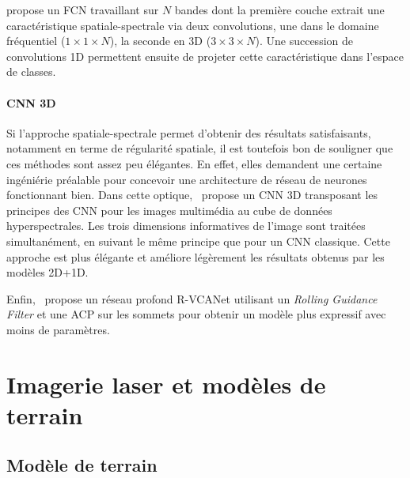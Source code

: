 \cite{lee_contextual_2016} propose un FCN travaillant sur $N$ bandes dont la première couche extrait une caractéristique spatiale-spectrale via deux convolutions, une dans le domaine fréquentiel ($1\times1\times{N}$), la seconde en 3D ($3\times3\times{N}$). Une succession de convolutions 1D permettent ensuite de projeter cette caractéristique dans l'espace de classes.

\paragraph{CNN 3D} Si l'approche spatiale-spectrale permet d'obtenir des résultats satisfaisants, notamment en terme de régularité spatiale, il est toutefois bon de souligner que ces méthodes sont assez peu élégantes. En effet, elles demandent une certaine ingéniérie préalable pour concevoir une architecture de réseau de neurones fonctionnant bien. Dans cette optique,~\cite{li_spectralspatial_2017} propose un CNN 3D transposant les principes des CNN pour les images multimédia au cube de données hyperspectrales. Les trois dimensions informatives de l'image sont traitées simultanément, en suivant le même principe que pour un CNN classique. Cette approche est plus élégante et améliore légèrement les résultats obtenus par les modèles 2D+1D.

Enfin,~\cite{pan_r-vcanet:_2017} propose un réseau profond R-VCANet utilisant un \textit{Rolling Guidance Filter} et une ACP sur les sommets pour obtenir un modèle plus expressif avec moins de paramètres.



\section{Imagerie laser et modèles de terrain}

\subsection{Modèle de terrain}

